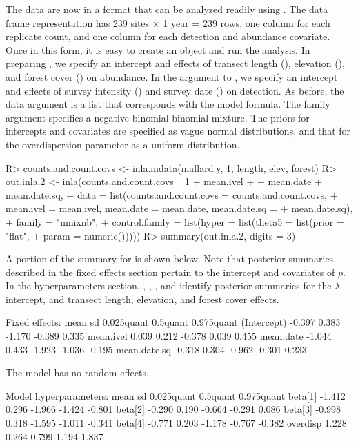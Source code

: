 \documentclass[codesnippet]{jss}
\begin{document}
The data are now in a format that can be analyzed readily using 
. The data frame representation has 239 sites $\times$ 1 year = 
239 rows, one 
column for each replicate count, and one column for each detection and 
abundance covariate. Once in this form, it is easy to create an 
 object and run the analysis. In preparing 
, we specify an intercept and effects of 
transect length (), elevation (), and forest cover 
() on abundance. In the  argument to , 
we specify an intercept and effects of survey intensity () and 
survey date () on detection. As before, the data argument is a 
list that corresponds with the model formula. The family argument specifies 
a negative binomial-binomial mixture. The priors for intercepts and 
covariates are specified as vague normal distributions, and that for the 
overdispersion parameter as a uniform distribution. 

\begin{CodeInput}
R> counts.and.count.covs <- inla.mdata(mallard.y, 1, length, elev, forest)
R> out.inla.2 <- inla(counts.and.count.covs ~ 1 + mean.ivel +
+    mean.date + mean.date.sq, 
+    data = list(counts.and.count.covs = counts.and.count.covs, 
+      mean.ivel = mean.ivel, mean.date = mean.date, mean.date.sq = 
+      mean.date.sq), 
+    family = "nmixnb", 
+    control.family = list(hyper = list(theta5 = list(prior = "flat",
+      param = numeric()))))
R> summary(out.inla.2, digits = 3)
\end{CodeInput}

A portion of the summary for  is shown below. Note that posterior summaries described in the fixed effects section pertain to the intercept and covariates of $p$. In the hyperparameters section, , , , and  identify posterior summaries for the $\lambda$ intercept, and transect length, elevation, and forest cover effects.

\begin{CodeOutput}
Fixed effects:
               mean    sd 0.025quant  0.5quant  0.975quant
(Intercept)  -0.397 0.383     -1.170    -0.389       0.335
mean.ivel     0.039 0.212     -0.378     0.039       0.455
mean.date    -1.044 0.433     -1.923    -1.036      -0.195
mean.date.sq -0.318 0.304     -0.962    -0.301       0.233

The model has no random effects.

Model hyperparameters:
             mean     sd  0.025quant  0.5quant  0.975quant
beta[1]    -1.412  0.296      -1.966    -1.424      -0.801 
beta[2]    -0.290  0.190      -0.664    -0.291       0.086
beta[3]    -0.998  0.318      -1.595    -1.011      -0.341
beta[4]    -0.771  0.203      -1.178    -0.767      -0.382
overdisp    1.228  0.264       0.799     1.194       1.837
\end{CodeOutput}
\end{document}
